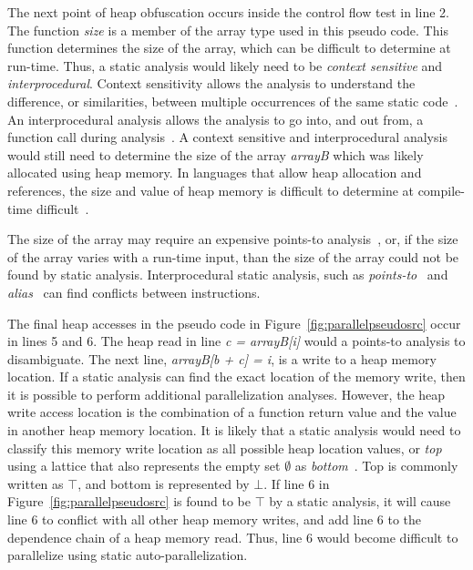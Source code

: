 \documentclass[defaultstyle,11pt]{thesis}
\begin{document}
The next point of heap obfuscation occurs inside the control flow test
in line 2. The function \textit{size} is a member of the array type
used in this pseudo code.  This function determines the size of the
array, which can be difficult to determine at run-time.  Thus, a
static analysis would likely need to be \textit{context sensitive} and
\textit{interprocedural}.  Context sensitivity allows the analysis to
understand the difference, or similarities, between multiple
occurrences of the same static code~\cite{emami:94:pldi}.  An
interprocedural analysis allows the analysis to go into, and out from,
a function call during analysis~\cite{allen:76:cacm}.  A context
sensitive and interprocedural analysis would still need to determine
the size of the array \textit{arrayB} which was likely allocated using
heap memory.  In languages that allow heap allocation and references,
the size and value of heap memory is difficult to determine at
compile-time difficult~\cite{kong:91:test, muchnick:97:mkp,
  towle:76:uiuccs}.

The size of the array may require an expensive points-to
analysis~\cite{steensgaard:96:popl}, or, if the size of the array
varies with a run-time input, than the size of the array could not be
found by static analysis. Interprocedural static analysis, such as
\textit{points-to}~\cite{steensgaard:96:popl} and
\textit{alias}~\cite{cooper:89:popl} can find conflicts between
instructions.

The final heap accesses in the pseudo code in
Figure~\ref{fig:parallelpseudosrc} occur in lines 5 and 6.  The heap
read in line \textit{c = arrayB[i]} would a points-to analysis to
disambiguate.  The next line, \textit{arrayB[b + c] = i}, is a write
to a heap memory location.  If a static analysis can find the exact
location of the memory write, then it is possible to perform
additional parallelization analyses.  However, the heap write access
location is the combination of a function return value and the value
in another heap memory location.  It is likely that a static analysis
would need to classify this memory write location as all possible heap
location values, or \textit{top} using a lattice that also represents
the empty set $\emptyset$ as \textit{bottom}~\cite{Tarski:1955kx,
  Davey:2002fj}.  Top is commonly written as $\top$, and bottom is
represented by $\bot$.  If line 6 in
Figure~\ref{fig:parallelpseudosrc} is found to be $\top$ by a static
analysis, it will cause line 6 to conflict with all other heap memory
writes, and add line 6 to the dependence chain of a heap memory read.
Thus, line 6 would become difficult to parallelize using static
auto-parallelization.
\end{document}

